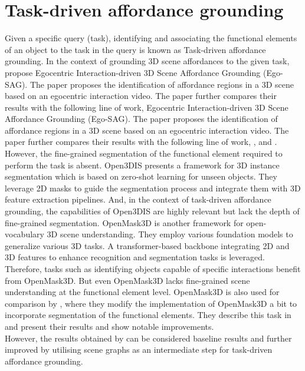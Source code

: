  \section{Task-driven affordance grounding}
Given a specific query (task), identifying and associating the functional elements of an object to the task in the query is known as Task-driven affordance grounding. 
In the context of grounding 3D scene affordances to the given task, \citet{liu2024grounding3dsceneaffordance} propose
 Egocentric Interaction-driven 3D Scene Affordance Grounding (Ego-SAG). The paper proposes the identification of affordance regions in a 3D scene based on 
 an egocentric interaction video. The paper further compares their results with the following line of work,
 Egocentric Interaction-driven 3D Scene Affordance Grounding (Ego-SAG). The paper proposes the identification of affordance regions in a 3D scene based on 
 an egocentric interaction video. The paper further compares their results with the following line of work,
\cite{huang2024openins3dsnaplookup3d}, \cite{Nguyen_2024_CVPR} and \cite{takmaz2023openmask3dopenvocabulary3dinstance}. However, the fine-grained 
segmentation of the functional element required to perform the task is absent. Open3DIS presents a framework for 3D instance segmentation which is based on
zero-shot learning for unseen objects. They leverage 2D masks to guide the segmentation process and integrate them with 3D feature extraction pipelines. And, in the context
of task-driven affordance grounding, the capabilities of Open3DIS are highly relevant but lack the depth of fine-grained segmentation. OpenMask3D is another framework
 for open-vocabulary 3D scene understanding. They employ
various foundation models to generalize various 3D tasks. A transformer-based backbone integrating 2D and 3D features to enhance recognition and segmentation tasks is leveraged. 
Therefore, tasks such as identifying objects capable of specific interactions benefit from OpenMask3D. 
But even OpenMask3D lacks fine-grained scene understanding at the functional element level.
OpenMask3D \cite{takmaz2023openmask3dopenvocabulary3dinstance} is also used for comparison by
\citet{delitzas2024scenefun3d}, where they modify the implementation of OpenMask3D a bit to incorporate segmentation of the functional elements. 
They describe this task in \cite{delitzas2024scenefun3d} and present their results and show notable improvements.\\
However, the results obtained by \citet{delitzas2024scenefun3d}
can be considered baseline results and further improved by utilising scene graphs as an intermediate step for task-driven affordance grounding.
